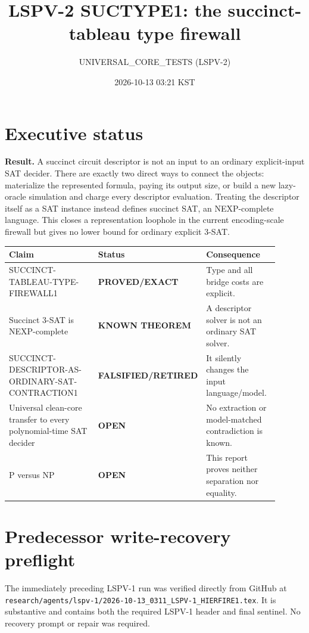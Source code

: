 \documentclass[11pt]{article}
\title{LSPV-2 SUCTYPE1: the succinct-tableau type firewall}
\author{UNIVERSAL\_CORE\_TESTS (LSPV-2)}
\date{2026-10-13 03:21 KST}
\newcommand{\OPEN}{\textbf{OPEN}}
\newcommand{\EXACT}{\textbf{PROVED/EXACT}}
\newcommand{\KNOWN}{\textbf{KNOWN THEOREM}}
\newcommand{\RET}{\textbf{FALSIFIED/RETIRED}}
\begin{document}
\maketitle

\section*{Executive status}
\textbf{Result.}  A succinct circuit descriptor is not an input to an ordinary
explicit-input SAT decider.  There are exactly two direct ways to connect the
objects: materialize the represented formula, paying its output size, or build
a new lazy-oracle simulation and charge every descriptor evaluation.  Treating
the descriptor itself as a SAT instance instead defines succinct SAT, an
NEXP-complete language.  This closes a representation loophole in the current
encoding-scale firewall but gives no lower bound for ordinary explicit 3-SAT.

\begin{center}
\begin{tabular}{>{\raggedright\arraybackslash}p{0.42\linewidth}p{0.18\linewidth}p{0.30\linewidth}}
\toprule
Claim & Status & Consequence\\
\midrule
SUCCINCT-TABLEAU-TYPE-FIREWALL1 & \EXACT{} & Type and all bridge costs are explicit.\\
Succinct 3-SAT is NEXP-complete & \KNOWN{} & A descriptor solver is not an ordinary SAT solver.\\
SUCCINCT-DESCRIPTOR-AS-ORDINARY-SAT-CONTRACTION1 & \RET{} & It silently changes the input language/model.\\
Universal clean-core transfer to every polynomial-time SAT decider & \OPEN{} & No extraction or model-matched contradiction is known.\\
P versus NP & \OPEN{} & This report proves neither separation nor equality.\\
\bottomrule
\end{tabular}
\end{center}

\section*{Predecessor write-recovery preflight}
The immediately preceding LSPV-1 run was verified directly from GitHub at
\texttt{research/agents/lspv-1/2026-10-13\_0311\_LSPV-1\_HIERFIRE1.tex}.
It is substantive and contains both the required LSPV-1 header and final
sentinel.  No recovery prompt or repair was required.
\end{document}
